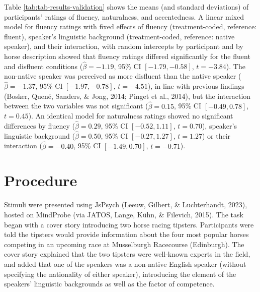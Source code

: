 \documentclass[
  man,floatsintext]{apa7}
\begin{document}
Table \ref{tab:tab-results-validation} shows the means (and standard deviations) of participants' ratings of fluency, naturalness, and accentedness. A linear mixed model for fluency ratings with fixed effects of fluency (treatment-coded, reference: fluent), speaker's linguistic background (treatment-coded, reference: native speaker), and their interaction, with random intercepts by participant and by horse description showed that fluency ratings differed significantly for the fluent and disfluent conditions (\(\hat{\beta} = -1.19\), 95\% CI \([-1.79, -0.58]\), \(t = -3.84\)). The non-native speaker was perceived as more disfluent than the native speaker (\(\hat{\beta} = -1.37\), 95\% CI \([-1.97, -0.78]\), \(t = -4.51\)), in line with previous findings (Bosker, Quené, Sanders, \& Jong, 2014; Pinget et al., 2014), but the interaction between the two variables was not significant (\(\hat{\beta} = 0.15\), 95\% CI \([-0.49, 0.78]\), \(t = 0.45\)). An identical model for naturalness ratings showed no significant differences by fluency (\(\hat{\beta} = 0.29\), 95\% CI \([-0.52, 1.11]\), \(t = 0.70\)), speaker's linguistic background (\(\hat{\beta} = 0.50\), 95\% CI \([-0.27, 1.27]\), \(t = 1.27\)) or their interaction (\(\hat{\beta} = -0.40\), 95\% CI \([-1.49, 0.70]\), \(t = -0.71\)).

\hypertarget{procedure}{%
\section{Procedure}\label{procedure}}

Stimuli were presented using JsPsych (Leeuw, Gilbert, \& Luchterhandt, 2023), hosted on MindProbe (via JATOS, Lange, Kühn, \& Filevich, 2015). The task began with a cover story introducing two horse racing tipsters. Participants were told the tipsters would provide information about the four most popular horses competing in an upcoming race at Musselburgh Racecourse (Edinburgh). The cover story explained that the two tipsters were well-known experts in the field, and added that one of the speakers was a non-native English speaker (without specifying the nationality of either speaker), introducing the element of the speakers' linguistic backgrounds as well as the factor of competence.
\end{document}
